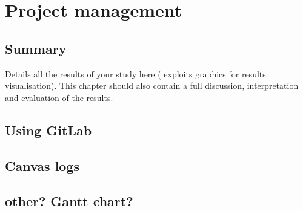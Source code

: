 
\chapter{Project management}
\label{chap:management}
\ifpdf
    \graphicspath{{Chapter4/Figures/PNG/}{Chapter3/Figures/PDF/}{Chapter4/Figures/}}
\else
    \graphicspath{{Chapter4/Figures/EPS/}{Chapter3/Figures/}}
\fi


\section*{Summary}
Details all the results of your study here ( exploits graphics for results visualisation). 
This chapter should also contain a full discussion, interpretation and evaluation of the results. 



\section{Using GitLab} 
\label{sec:gitlab}
\section{Canvas logs} 
\label{sec:canvaslogs}
\section{other? Gantt chart?} 
\label{sec:ganttchart}

